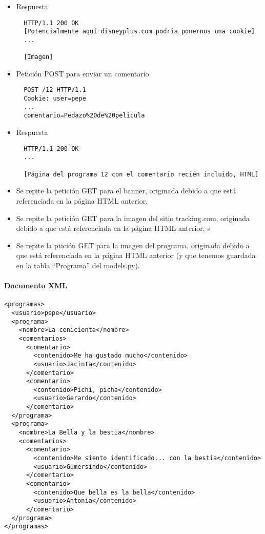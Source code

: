 \begin{itemize}
\item Respuesta

\begin{verbatim}
  HTTP/1.1 200 OK
  [Potencialmente aquí disneyplus.com podria ponernos una cookie]
  ...

  [Imagen]
\end{verbatim}

\item Petición POST para enviar un comentario

\begin{verbatim}
  POST /12 HTTP/1.1
  Cookie: user=pepe
  ...
  comentario=Pedazo%20de%20pelicula
\end{verbatim}

\item Respuesta

\begin{verbatim}
  HTTP/1.1 200 OK
  ...

  [Página del programa 12 con el comentario recién incluido, HTML]
\end{verbatim}

\item Se repite la petición GET para el banner, originada debido a que está referenciada en la página HTML anterior.

\item Se repite la petición GET para la imagen del sitio tracking.com, originada debido a que está referenciada en la página HTML anterior.
s
\item Se repite la ptición GET para la imagen del programa, originada debido a que está referenciada en la página HTML anterior (y que tenemos guardada en la tabla ``Programa'' del models.py).

\end{itemize}

\paragraph{Documento XML}

\begin{verbatim}
<programas>
  <usuario>pepe</usuario>
  <programa>
    <nombre>La cenicienta</nombre>
    <comentarios>
      <comentario>
        <contenido>Me ha gustado mucho</contenido>
        <usuario>Jacinta</contenido>
      </comentario>
      <comentario>
        <contenido>Pichi, picha</contenido>
        <usuario>Gerardo</contenido>
      </comentario>
  </programa>
  <programa>
    <nombre>La Bella y la bestia</nombre>
    <comentarios>
      <comentario>
        <contenido>Me siento identificado... con la bestia</contenido>
        <usuario>Gumersindo</contenido>
      </comentario>
      <comentario>
        <contenido>Que bella es la bella</contenido>
        <usuario>Antonia</contenido>
      </comentario>
  </programa>
</programas>  
\end{verbatim}

